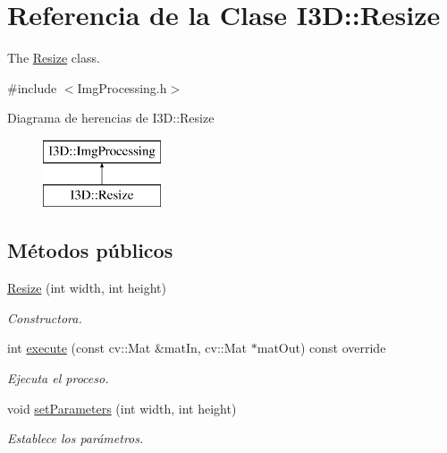 \hypertarget{class_i3_d_1_1_resize}{}\section{Referencia de la Clase I3D\+:\+:Resize}
\label{class_i3_d_1_1_resize}


The \hyperlink{class_i3_d_1_1_resize}{Resize} class.  




{\ttfamily \#include $<$Img\+Processing.\+h$>$}

Diagrama de herencias de I3D\+:\+:Resize\begin{figure}[H]
\begin{center}
\leavevmode
\includegraphics[height=2.000000cm]{class_i3_d_1_1_resize}
\end{center}
\end{figure}
\subsection*{Métodos públicos}
\begin{DoxyCompactItemize}
\item 
\hyperlink{class_i3_d_1_1_resize_a4f0bbaa5ea82c7390880dae533a34a92}{Resize} (int width, int height)
\begin{DoxyCompactList}\small\item\em Constructora. \end{DoxyCompactList}\item 
int \hyperlink{class_i3_d_1_1_resize_a683bd71d9e24c64416dc68231728a73e}{execute} (const cv\+::\+Mat \&mat\+In, cv\+::\+Mat $\ast$mat\+Out) const  override
\begin{DoxyCompactList}\small\item\em Ejecuta el proceso. \end{DoxyCompactList}\item 
void \hyperlink{class_i3_d_1_1_resize_adbe9397a26987a2744c509ad1e08d6f5}{set\+Parameters} (int width, int height)
\begin{DoxyCompactList}\small\item\em Establece los parámetros. \end{DoxyCompactList}\end{DoxyCompactItemize}
